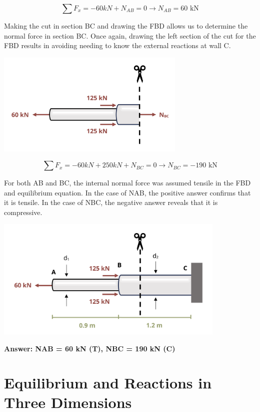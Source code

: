 \documentclass[
  letterpaper,
  DIV=11,
  numbers=noendperiod]{scrreprt}
\begin{document}
\begin{tcolorbox}
\[
\sum F_x=-60 k N+N_{A B}=0 \rightarrow N_{A B}=60 \text{ kN}
\]

Making the cut in section BC and drawing the FBD allows us to determine
the normal force in section BC. Once again, drawing the left section of
the cut for the FBD results in avoiding needing to know the external
reactions at wall C.

\begin{center}
\includegraphics[width=3.5625in,height=\textheight]{images/CH1 PNGs/example 1.5 part 3.png}
\end{center}

\[
\sum F_x=-60 k N+250 k N+N_{B C}=0 \rightarrow N_{B C}=-190 \text{ kN}
\]

For both AB and BC, the internal normal force was assumed tensile in the
FBD and equilibrium equation. In the case of NAB, the positive answer
confirms that it is tensile. In the case of NBC, the negative answer
reveals that it is compressive.

\begin{center}
\includegraphics[width=4.34375in,height=\textheight]{images/CH1 PNGs/example 1.5 part 4.png}
\end{center}

\textbf{Answer: NAB = 60 kN (T), NBC = 190 kN (C)}

\end{tcolorbox}

\section{Equilibrium and Reactions in Three
Dimensions}\label{equilibrium-and-reactions-in-three-dimensions}
\end{document}
